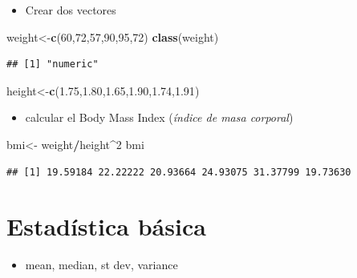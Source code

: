 \documentclass[]{book}
\newenvironment{Shaded}{\begin{snugshade}}{\end{snugshade}}
\newcommand{\KeywordTok}[1]{\textcolor[rgb]{0.13,0.29,0.53}{\textbf{#1}}}
\newcommand{\DecValTok}[1]{\textcolor[rgb]{0.00,0.00,0.81}{#1}}
\newcommand{\FloatTok}[1]{\textcolor[rgb]{0.00,0.00,0.81}{#1}}
\newcommand{\StringTok}[1]{\textcolor[rgb]{0.31,0.60,0.02}{#1}}
\newcommand{\OperatorTok}[1]{\textcolor[rgb]{0.81,0.36,0.00}{\textbf{#1}}}
\newcommand{\NormalTok}[1]{#1}
\providecommand{\tightlist}{%
  \setlength{\itemsep}{0pt}\setlength{\parskip}{0pt}}
\begin{document}
\begin{itemize}
\tightlist
\item
  Crear dos vectores
\end{itemize}

\begin{Shaded}
\begin{Highlighting}[]
\NormalTok{weight<-}\KeywordTok{c}\NormalTok{(}\DecValTok{60}\NormalTok{,}\DecValTok{72}\NormalTok{,}\DecValTok{57}\NormalTok{,}\DecValTok{90}\NormalTok{,}\DecValTok{95}\NormalTok{,}\DecValTok{72}\NormalTok{)  }
\KeywordTok{class}\NormalTok{(weight)}
\end{Highlighting}
\end{Shaded}

\begin{verbatim}
## [1] "numeric"
\end{verbatim}

\begin{Shaded}
\begin{Highlighting}[]
\NormalTok{height<-}\KeywordTok{c}\NormalTok{(}\FloatTok{1.75}\NormalTok{,}\FloatTok{1.80}\NormalTok{,}\FloatTok{1.65}\NormalTok{,}\FloatTok{1.90}\NormalTok{,}\FloatTok{1.74}\NormalTok{,}\FloatTok{1.91}\NormalTok{)}
\end{Highlighting}
\end{Shaded}

\begin{itemize}
\tightlist
\item
  calcular el Body Mass Index (\emph{índice de masa corporal})
\end{itemize}

\begin{Shaded}
\begin{Highlighting}[]
\NormalTok{bmi<-}\StringTok{ }\NormalTok{weight}\OperatorTok{/}\NormalTok{height}\OperatorTok{^}\DecValTok{2}
\NormalTok{bmi}
\end{Highlighting}
\end{Shaded}

\begin{verbatim}
## [1] 19.59184 22.22222 20.93664 24.93075 31.37799 19.73630
\end{verbatim}

\section{Estadística básica}\label{estaduxedstica-buxe1sica}

\begin{itemize}
\tightlist
\item
  mean, median, st dev, variance
\end{itemize}
\end{document}
